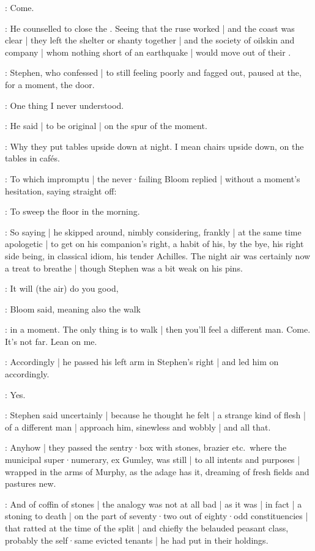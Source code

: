 \Bloom:
Come.

:
He counselled to close the .
Seeing that the ruse worked |
and the coast was clear |
they left the shelter or shanty together |
and the  society of oilskin and company |
whom nothing short of an earthquake |
would move out of their .

:
Stephen,
who confessed |
to still feeling poorly and fagged out,
paused at the,
for a moment,
the door.

\Stephen:
One thing I never understood.

:
He said |
to be original |
on the spur of the moment.

\Stephen:
Why they put tables upside down at night.
I mean chairs upside down,
on the tables in cafés.%

:
To which impromptu |
the never·failing Bloom replied |
without a moment's hesitation,
saying straight off:

\Bloom:
To sweep the floor in the morning.

:
So saying |
he skipped around,
nimbly considering,
frankly |
at the same time apologetic |
to get on his companion's right,
a habit of his,
by the bye,
his right side being,
in classical idiom,
his tender Achilles.
The night air was certainly now a treat to breathe |
though Stephen was a bit weak on his pins.

\Bloom:
It will (the air) do you good,

:
Bloom said,
meaning also the walk

\Bloom:
in a moment.
The only thing is to walk |
then you'll feel a different man.
Come.
It's not far.
Lean on me.%

:
Accordingly |
he passed his left arm in Stephen's right |
and led him on accordingly.

\Stephen:
Yes.

:
Stephen said uncertainly |
because he thought he felt |
a strange kind of flesh |
of a different man |
approach him,
sinewless and wobbly |
and all that.

:
Anyhow |
they passed the sentry·box with stones,
brazier etc.\
where the municipal super·numerary,
ex Gumley,
was still |
to all intents and purposes |
wrapped in the arms of Murphy,
as the adage has it,
dreaming of fresh fields and pastures new.

:
And  of coffin of stones |
the analogy was not at all bad |
as it was |
in fact |
a stoning to death |
on the part of seventy·two out of eighty·odd constituencies |
that ratted at the time of the split |
and chiefly the belauded peasant class,
probably the self·same evicted tenants |
he had put in their holdings.

